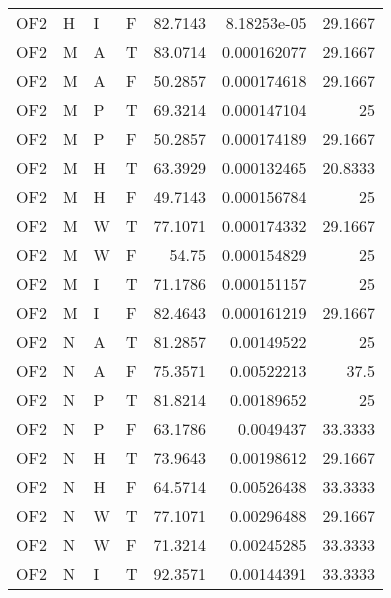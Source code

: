 \begin{longtable}{llllrrr}
    OF2      & H         & I         & F          & 82.7143    & 8.18253e-05 & 29.1667  \\
    OF2      & M         & A         & T          & 83.0714    & 0.000162077 & 29.1667  \\
    OF2      & M         & A         & F          & 50.2857    & 0.000174618 & 29.1667  \\
    OF2      & M         & P         & T          & 69.3214    & 0.000147104 & 25       \\
    OF2      & M         & P         & F          & 50.2857    & 0.000174189 & 29.1667  \\
    OF2      & M         & H         & T          & 63.3929    & 0.000132465 & 20.8333  \\
    OF2      & M         & H         & F          & 49.7143    & 0.000156784 & 25       \\
    OF2      & M         & W         & T          & 77.1071    & 0.000174332 & 29.1667  \\
    OF2      & M         & W         & F          & 54.75      & 0.000154829 & 25       \\
    OF2      & M         & I         & T          & 71.1786    & 0.000151157 & 25       \\
    OF2      & M         & I         & F          & 82.4643    & 0.000161219 & 29.1667  \\
    OF2      & N         & A         & T          & 81.2857    & 0.00149522  & 25       \\
    OF2      & N         & A         & F          & 75.3571    & 0.00522213  & 37.5     \\
    OF2      & N         & P         & T          & 81.8214    & 0.00189652  & 25       \\
    OF2      & N         & P         & F          & 63.1786    & 0.0049437   & 33.3333  \\
    OF2      & N         & H         & T          & 73.9643    & 0.00198612  & 29.1667  \\
    OF2      & N         & H         & F          & 64.5714    & 0.00526438  & 33.3333  \\
    OF2      & N         & W         & T          & 77.1071    & 0.00296488  & 29.1667  \\
    OF2      & N         & W         & F          & 71.3214    & 0.00245285  & 33.3333  \\
    OF2      & N         & I         & T          & 92.3571    & 0.00144391  & 33.3333  \\

\end{longtable}
